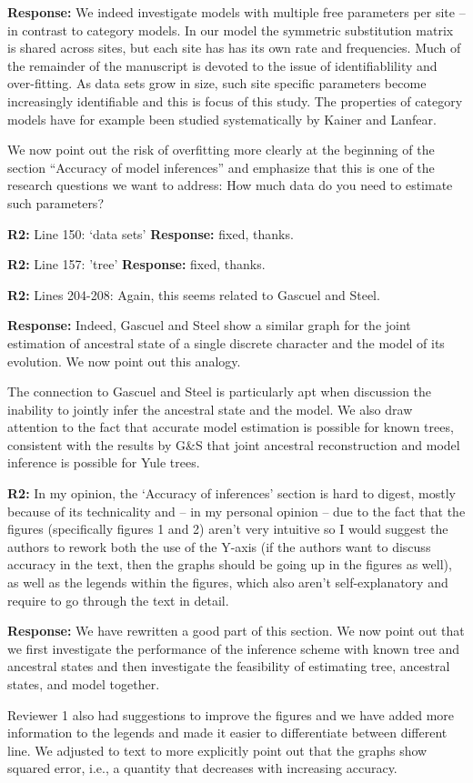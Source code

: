 \documentclass[aps,rmp,onecolumn]{revtex4-1}
\newcommand{\refb}[1]{\textbf{R2:} #1}
\newcommand{\response}[1]{{\color{black}\textbf{Response:} #1}}
\begin{document}
\response{We indeed investigate models with multiple free parameters per site -- in contrast to category models.
In our model the symmetric substitution matrix is shared across sites, but each site has has its own rate and frequencies.
Much of the remainder of the manuscript is devoted to the issue of identifiablility and over-fitting.
As data sets grow in size, such site specific parameters become increasingly identifiable and this is focus of this study.
The properties of category models have for example been studied systematically by Kainer and Lanfear.

We now point out the risk of overfitting more clearly at the beginning of the section ``Accuracy of model inferences'' and emphasize that this is one of the research questions we want to address: How much data do you need to estimate such parameters?
}


\refb{Line 150: `data sets'}
\response{fixed, thanks.}

\refb{Line 157: 'tree'}
\response{fixed, thanks.}

\refb{Lines 204-208: Again, this seems related to Gascuel and Steel.}

\response{Indeed, Gascuel and Steel show a similar graph for the joint estimation of ancestral state of a single discrete character and the model of its evolution. We now point out this analogy.

The connection to Gascuel and Steel is particularly apt when discussion the inability to jointly infer the ancestral state and the model.
We also draw attention to the fact that accurate model estimation is possible for known trees, consistent with the results by G\&S that joint ancestral reconstruction and model inference is possible for Yule trees.
}

\refb{In my opinion, the ‘Accuracy of inferences’ section is hard to digest, mostly because of its technicality and -- in my personal opinion -- due to the fact that the figures (specifically figures 1 and 2) aren’t very intuitive so I would suggest the authors to rework both the use of the Y-axis (if the authors want to discuss accuracy in the text, then the graphs should be going up in the figures as well), as well as the legends within the figures, which also aren’t self-explanatory and require to go through the text in detail.}

\response{We have rewritten a good part of this section. We now point out that we first investigate the performance of the inference scheme with known tree and ancestral states and then investigate the feasibility of estimating tree, ancestral states, and model together.

Reviewer 1 also had suggestions to improve the figures and we have added more information to the legends and made it easier to differentiate between different line.
We adjusted to text to more explicitly point out that the graphs show squared error, i.e., a quantity that decreases with increasing accuracy.
}
\end{document}
